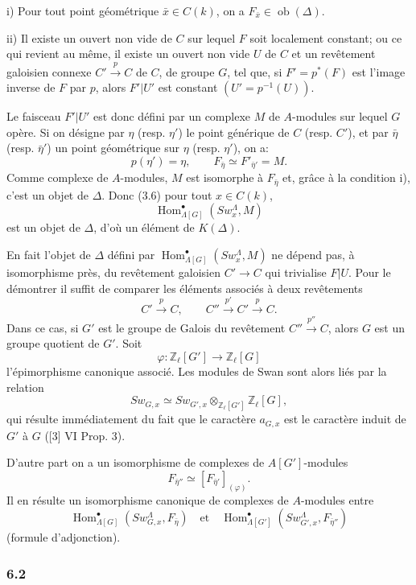 \documentclass[11pt]{article}
\DeclareMathOperator{\Hom}{Hom}
\providecommand{\Ob}{\operatorname{ob}}
\providecommand{\Hom}{\operatorname{Hom}}
\providecommand{\Ob}{\operatorname{ob}}
\providecommand{\Ob}{\operatorname{Ob}}
\providecommand{\Hom}{\operatorname{Hom}}
\providecommand{\Ob}{\operatorname{ob}}
\providecommand{\Ob}{\operatorname{Ob}}
\begin{document}
i) Pour tout point géométrique $\bar x\in C(k)$, on a $F_{\bar x}\in\Ob(\Delta)$.

ii) Il existe un ouvert non vide de $C$ sur lequel $F$ soit localement constant; ou ce qui revient au même, il existe un ouvert non vide $U$ de $C$ et un revêtement galoisien connexe $C'\xrightarrow{p}C$ de $C$, de groupe $G$, tel que, si $F'=p^*(F)$ est l'image inverse de $F$ par $p$, alors $F'|U'$ est constant $(U'=p^{-1}(U))$.

Le faisceau $F'|U'$ est donc défini par un complexe $M$ de $A$-modules sur lequel $G$ opère. Si on désigne par $\eta$ (resp. $\eta'$) le point générique de $C$ (resp. $C'$), et par $\bar\eta$ (resp. $\bar\eta'$) un point géométrique sur $\eta$ (resp. $\eta'$), on a:
\[
p(\eta')=\eta,\qquad
F_{\bar\eta}\simeq F'_{\bar\eta'}=M.
\tag{6.1.1}
\]
Comme complexe de $A$-modules, $M$ est isomorphe à $F_{\bar\eta}$ et, grâce à la condition i), c'est un objet de $\Delta$. Donc (3.6) pour tout $x\in C(k)$,
\[
\Hom^\bullet_{\Lambda[G]}(Sw_x^\Lambda,M)
\]
est un objet de $\Delta$, d'où un élément de $K(\Delta)$.

En fait l'objet de $\Delta$ défini par $\Hom^\bullet_{\Lambda[G]}(Sw_x^\Lambda,M)$ ne dépend pas, à isomorphisme près, du revêtement galoisien $C'\to C$ qui trivialise $F|U$. Pour le démontrer il suffit de comparer les éléments associés à deux revêtements
\[
C'\xrightarrow{p}C,\qquad C''\xrightarrow{p'}C'\xrightarrow{p}C.
\]
Dans ce cas, si $G'$ est le groupe de Galois du revêtement $C''\xrightarrow{p''}C$, alors $G$ est un groupe quotient de $G'$. Soit
\[
\varphi:\mathbb Z_\ell[G']\longrightarrow \mathbb Z_\ell[G]
\]
l'épimorphisme canonique associé. Les modules de Swan sont alors liés par la relation
\[
Sw_{G,x}\simeq Sw_{G',x}\otimes_{\mathbb Z_\ell[G']}\mathbb Z_\ell[G],
\]
qui résulte immédiatement du fait que le caractère $a_{G,x}$ est le caractère induit de $G'$ à $G$ ([3] VI Prop. 3).

D'autre part on a un isomorphisme de complexes de $A[G']$-modules
\[
F_{\bar\eta''}\simeq [F_{\bar\eta'}]_{(\varphi)}.
\]
Il en résulte un isomorphisme canonique de complexes de $A$-modules entre
\[
\Hom^\bullet_{\Lambda[G]}(Sw_{G,x}^\Lambda,F_{\bar\eta})
\quad\text{et}\quad
\Hom^\bullet_{\Lambda[G']}(Sw_{G',x}^\Lambda,F_{\bar\eta''})
\]
(formule d'adjonction).

\subsubsection*{6.2}
\end{document}
